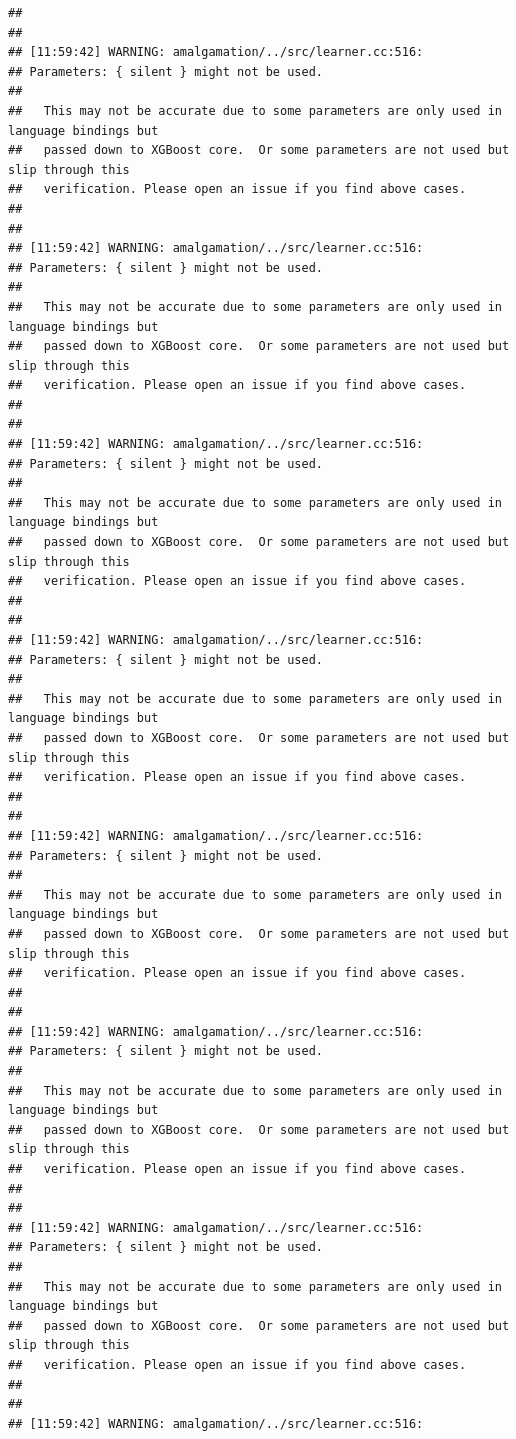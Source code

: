 \documentclass[AMS,STIX2COL]{WileyNJD-v2}\usepackage[]{graphicx}\usepackage[]{color}
\makeatletter
\newenvironment{kframe}{%
 \def\at@end@of@kframe{}%
 \ifinner\ifhmode%
  \def\at@end@of@kframe{\end{minipage}}%
  \begin{minipage}{\columnwidth}%
 \fi\fi%
 \def\FrameCommand##1{\hskip\@totalleftmargin \hskip-\fboxsep
 \colorbox{shadecolor}{##1}\hskip-\fboxsep
     \hskip-\linewidth \hskip-\@totalleftmargin \hskip\columnwidth}%
 \MakeFramed {\advance\hsize-\width
   \@totalleftmargin\z@ \linewidth\hsize
   \@setminipage}}%
 {\par\unskip\endMakeFramed%
 \at@end@of@kframe}
\newenvironment{knitrout}{}{} %
\makeatother
\begin{document}
\begin{knitrout}
\begin{kframe}
\begin{verbatim}
## 
## 
## [11:59:42] WARNING: amalgamation/../src/learner.cc:516: 
## Parameters: { silent } might not be used.
## 
##   This may not be accurate due to some parameters are only used in language bindings but
##   passed down to XGBoost core.  Or some parameters are not used but slip through this
##   verification. Please open an issue if you find above cases.
## 
## 
## [11:59:42] WARNING: amalgamation/../src/learner.cc:516: 
## Parameters: { silent } might not be used.
## 
##   This may not be accurate due to some parameters are only used in language bindings but
##   passed down to XGBoost core.  Or some parameters are not used but slip through this
##   verification. Please open an issue if you find above cases.
## 
## 
## [11:59:42] WARNING: amalgamation/../src/learner.cc:516: 
## Parameters: { silent } might not be used.
## 
##   This may not be accurate due to some parameters are only used in language bindings but
##   passed down to XGBoost core.  Or some parameters are not used but slip through this
##   verification. Please open an issue if you find above cases.
## 
## 
## [11:59:42] WARNING: amalgamation/../src/learner.cc:516: 
## Parameters: { silent } might not be used.
## 
##   This may not be accurate due to some parameters are only used in language bindings but
##   passed down to XGBoost core.  Or some parameters are not used but slip through this
##   verification. Please open an issue if you find above cases.
## 
## 
## [11:59:42] WARNING: amalgamation/../src/learner.cc:516: 
## Parameters: { silent } might not be used.
## 
##   This may not be accurate due to some parameters are only used in language bindings but
##   passed down to XGBoost core.  Or some parameters are not used but slip through this
##   verification. Please open an issue if you find above cases.
## 
## 
## [11:59:42] WARNING: amalgamation/../src/learner.cc:516: 
## Parameters: { silent } might not be used.
## 
##   This may not be accurate due to some parameters are only used in language bindings but
##   passed down to XGBoost core.  Or some parameters are not used but slip through this
##   verification. Please open an issue if you find above cases.
## 
## 
## [11:59:42] WARNING: amalgamation/../src/learner.cc:516: 
## Parameters: { silent } might not be used.
## 
##   This may not be accurate due to some parameters are only used in language bindings but
##   passed down to XGBoost core.  Or some parameters are not used but slip through this
##   verification. Please open an issue if you find above cases.
## 
## 
## [11:59:42] WARNING: amalgamation/../src/learner.cc:516: 

\end{verbatim}
\end{kframe}
\end{knitrout}
\end{document}
